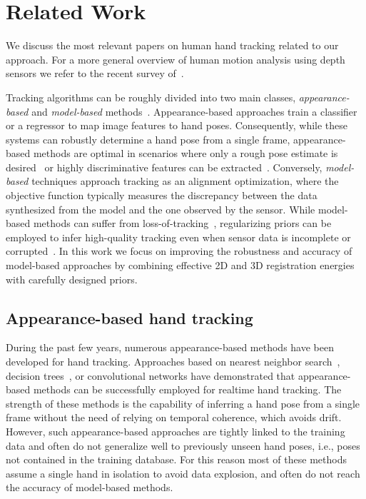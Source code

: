 
\section{Related Work}
\label{sec:htrack-related}



We discuss the most relevant papers on human hand tracking related to our approach. For a more general overview of human motion analysis using depth sensors we refer to the recent survey of~\cite{ye_13}.

Tracking algorithms can be roughly divided into two main classes, \emph{appearance-based} and \emph{model-based} methods~\cite{erol2007vision}.
Appearance-based approaches train a classifier or a regressor to map image features to hand poses. Consequently, while these systems can robustly determine a hand pose from a single frame, appearance-based methods are optimal in scenarios where only a rough pose estimate is desired~\cite{wang_uist11} or highly discriminative features can be extracted~\cite{wang2009colorglove}. Conversely, \emph{model-based} techniques approach tracking as an alignment optimization, where the objective function typically measures the discrepancy between the data synthesized from the model and the one observed by the sensor. While model-based methods can suffer from loss-of-tracking~\cite{wei_siga12}, regularizing priors can be employed to infer high-quality tracking even when sensor data is incomplete or corrupted~\cite{melax2013dynamics,schroder2014real}. 
In this work we focus on improving the robustness and accuracy of model-based approaches by combining effective 2D and 3D registration energies with carefully designed priors.

\subsection*{Appearance-based hand tracking} 
During the past few years, numerous appearance-based methods have been developed for hand tracking. Approaches based on nearest neighbor search~\cite{wang2009colorglove,wang_uist11,romero_13}, decision trees~\cite{keskin2012hand,tang2013real,tang_cvpr14,krupka2014discriminative}, or convolutional networks \cite{tompson2014real} have demonstrated that appearance-based methods can be successfully employed for realtime hand tracking. The strength of these methods is the capability of inferring a hand pose from a single frame without the need of relying on temporal coherence, which avoids drift.
 However, such appearance-based approaches are tightly linked to the training data and often do not generalize well to previously unseen hand poses, i.e., poses not contained in the training database. For this reason most of these methods assume a single hand in isolation to avoid data explosion, and often do not reach the accuracy of model-based methods.

